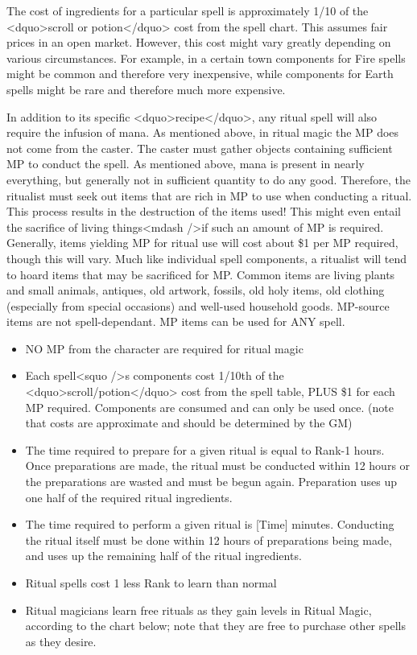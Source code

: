 The cost of ingredients for a particular spell is approximately 1/10
of the <dquo>scroll or potion</dquo> cost from the spell chart. This assumes
fair prices in an open market.  However, this cost might vary greatly
depending on various circumstances.  For example, in a certain town
components for Fire spells might be common and therefore very
inexpensive, while components for Earth spells might be rare and
therefore much more expensive.

In addition to its specific <dquo>recipe</dquo>, any ritual spell will also
require the infusion of mana.  As mentioned above, in ritual magic the
MP does not come from the caster.  The caster must gather objects
containing sufficient MP to conduct the spell.  As mentioned above,
mana is present in nearly everything, but generally not in sufficient
quantity to do any good.  Therefore, the ritualist must seek out items
that are rich in MP to use when conducting a ritual.  This process
results in the destruction of the items used!  This might even entail
the sacrifice of living things<mdash />if such an amount of MP is required.
Generally, items yielding MP for ritual use will cost about \$1 per MP
required, though this will vary.  Much like individual spell
components, a ritualist will tend to hoard items that may be
sacrificed for MP.  Common items are living plants and small animals,
antiques, old artwork, fossils, old holy items, old clothing
(especially from special occasions) and well-used household goods.
MP-source items are not spell-dependant.  MP items can be used for ANY
spell.

\begin{itemize}
\item NO MP from the character are required for ritual magic
\item Each spell<squo />s components cost 1/10th of the <dquo>scroll/potion</dquo>
  cost from the spell table, PLUS \$1 for each MP required.
  Components are consumed and can only be used once.  (note that costs
  are approximate and should be determined by the GM)
\item The time required to prepare for a given ritual is equal to
  Rank-1 hours.  Once preparations are made, the ritual must be
  conducted within 12 hours or the preparations are wasted and must be
  begun again.  Preparation uses up one half of the required ritual
  ingredients.
\item The time required to perform a given ritual is [Time] minutes.
  Conducting the ritual itself must be done within 12 hours of
  preparations being made, and uses up the remaining half of the
  ritual ingredients.
\item	Ritual spells cost 1 less Rank to learn than normal
\item Ritual magicians learn free rituals as they gain levels in
  Ritual Magic, according to the chart below; note that they are free
  to purchase other spells as they desire.
\end{itemize}

